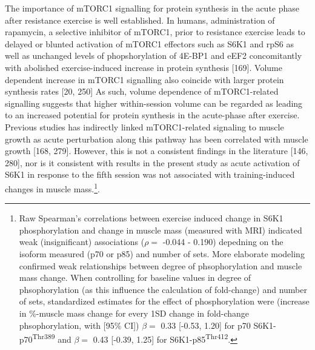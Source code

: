 \documentclass[twoside,10pt]{gihclass} %
\begin{document}
The importance of mTORC1 signalling for protein synthesis in the acute phase after resistance exercise is well established.
In humans, administration of rapamycin, a selective inhibitor of mTORC1, prior to resistance exercise leads to delayed or blunted activation of mTORC1 effectors such as
S6K1 and rpS6 as well as unchanged levels of phopshorylation of 4E-BP1 and eEF2 concomitantly with abolished exercise-induced increase in protein synthesis
{[}169{]}.
Volume dependent increase in mTORC1 signalling also coincide with larger protein synthesis rates
{[}20, 250{]}
As such, volume dependence of mTORC1-related signalling suggests that higher within-session volume can be regarded as leading to an increased potential for protein synthesis in the acute-phase after exercise.
Previous studies has indirectly linked mTORC1-related signaling to muscle growth as acute perturbation along this pathway has been correlated with muscle growth
{[}168, 279{]}.
However, this is not a consistent findings in the literature
{[}146, 280{]},
nor is it consistent with results in the present study as acute activation of S6K1 in response to the fifth session was not associated with training-induced changes in muscle mass.\footnote{Raw Spearman's correlations between exercise induced change in S6K1 phosphorylation and change in muscle mass (measured with MRI) indicated weak (insignificant) associations (\(\rho=\) -0.044 - 0.190) depedning on the isoform measured (p70 or p85) and number of sets. More elaborate modeling confirmed weak relationships between degree of phsophorylation and muscle mass change. When controlling for baseline values in degree of phsophorylation (as this influence the calculation of fold-change) and number of sets, standardized estimates for the effect of phosphorylation were (increase in \%-muscle mass change for every 1SD change in fold-change phsophorylation, with {[}95\% CI{]}) \(\beta=\) 0.33 {[}-0.53, 1.20{]} for p70 S6K1-p70\textsuperscript{Thr389} and \(\beta=\) 0.43 {[}-0.39, 1.25{]} for S6K1-p85\textsuperscript{Thr412}.}.
\end{document}
